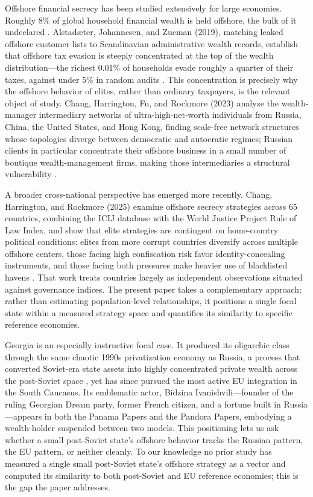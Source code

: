 \documentclass[9pt,twoside]{pnas-new}
\begin{document}
Offshore financial secrecy has been studied extensively for large economies. Roughly 8\% of global household financial wealth is held offshore, the bulk of it undeclared \cite{zucman2015}. Alstad{\ae}ter, Johannesen, and Zucman (2019), matching leaked offshore customer lists to Scandinavian administrative wealth records, establish that offshore tax evasion is steeply concentrated at the top of the wealth distribution---the richest 0.01\% of households evade roughly a quarter of their taxes, against under 5\% in random audits \cite{alstadsaeter2019}. This concentration is precisely why the offshore behavior of elites, rather than ordinary taxpayers, is the relevant object of study. Chang, Harrington, Fu, and Rockmore (2023) analyze the wealth-manager intermediary networks of ultra-high-net-worth individuals from Russia, China, the United States, and Hong Kong, finding scale-free network structures whose topologies diverge between democratic and autocratic regimes; Russian clients in particular concentrate their offshore business in a small number of boutique wealth-management firms, making those intermediaries a structural vulnerability \cite{chang2023}.

A broader cross-national perspective has emerged more recently. Chang, Harrington, and Rockmore (2025) examine offshore secrecy strategies across 65 countries, combining the ICIJ database with the World Justice Project Rule of Law Index, and show that elite strategies are contingent on home-country political conditions: elites from more corrupt countries diversify across multiple offshore centers, those facing high confiscation risk favor identity-concealing instruments, and those facing both pressures make heavier use of blacklisted havens \cite{chang2025}. That work treats countries largely as independent observations situated against governance indices. The present paper takes a complementary approach: rather than estimating population-level relationships, it positions a single focal state within a measured strategy space and quantifies its similarity to specific reference economies.

Georgia is an especially instructive focal case. It produced its oligarchic class through the same chaotic 1990s privatization economy as Russia, a process that converted Soviet-era state assets into highly concentrated private wealth across the post-Soviet space \cite{novokmet2018}, yet has since pursued the most active EU integration in the South Caucasus. Its emblematic actor, Bidzina Ivanishvili---founder of the ruling Georgian Dream party, former French citizen, and a fortune built in Russia---appears in both the Panama Papers and the Pandora Papers, embodying a wealth-holder suspended between two models. This positioning lets us ask whether a small post-Soviet state's offshore behavior tracks the Russian pattern, the EU pattern, or neither cleanly. To our knowledge no prior study has measured a single small post-Soviet state's offshore strategy as a vector and computed its similarity to both post-Soviet and EU reference economies; this is the gap the paper addresses.\Endparasplit
\end{document}
